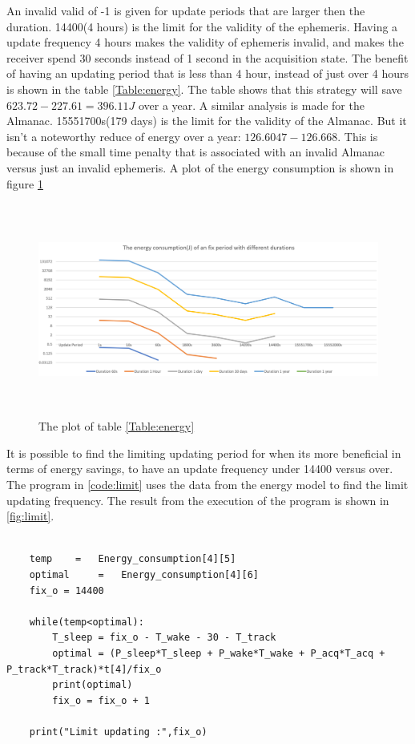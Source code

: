 An invalid valid of -1 is given for update periods that are larger then the duration. 14400(4 hours) is the limit for the validity of the ephemeris. Having a update frequency 4 hours makes the validity of  ephemeris invalid, and makes the receiver spend 30 seconds instead of 1 second in the acquisition state. The benefit of having an updating period that is less than 4 hour, instead of just over 4 hours is shown in the table \ref{Table:energy}. The table shows that this strategy will save  $623.72 - 227.61 = 396.11 J$ over a year. A similar analysis is made for the Almanac. 15551700s(179 days) is the limit for the validity of the Almanac. But it isn't a noteworthy reduce of energy over a year:  $126.6047 - 126.668$. This is because of the small time penalty that is associated with an invalid Almanac versus just an invalid  ephemeris. A plot of the energy consumption is shown in figure \ref{fig:energyconsumption}

\begin{figure}[H]
\centering
\includegraphics[height=7.0cm]{Project_Report/Images/energyconsumption.PNG}
\caption{The plot of table \ref{Table:energy}}
\label{fig:energyconsumption}
\end{figure}


It is possible to find the limiting updating period for when its more beneficial in terms of energy savings, to have an update frequency under 14400 versus over. The program in \ref{code:limit} uses the data from the energy model to find the limit updating frequency. The result from the execution of the program is shown in \ref{fig:limit}. 



\lstset{language=Python}          %
\begin{lstlisting}[frame=single, caption= Code used for finding the beneficial limit]  % Start your code-block

    temp    =   Energy_consumption[4][5]
    optimal     =   Energy_consumption[4][6]
    fix_o = 14400

    while(temp<optimal):  
        T_sleep = fix_o - T_wake - 30 - T_track
        optimal = (P_sleep*T_sleep + P_wake*T_wake + P_acq*T_acq + P_track*T_track)*t[4]/fix_o
        print(optimal)
        fix_o = fix_o + 1

    print("Limit updating :",fix_o)
\end{lstlisting}
\label{code:limit}



